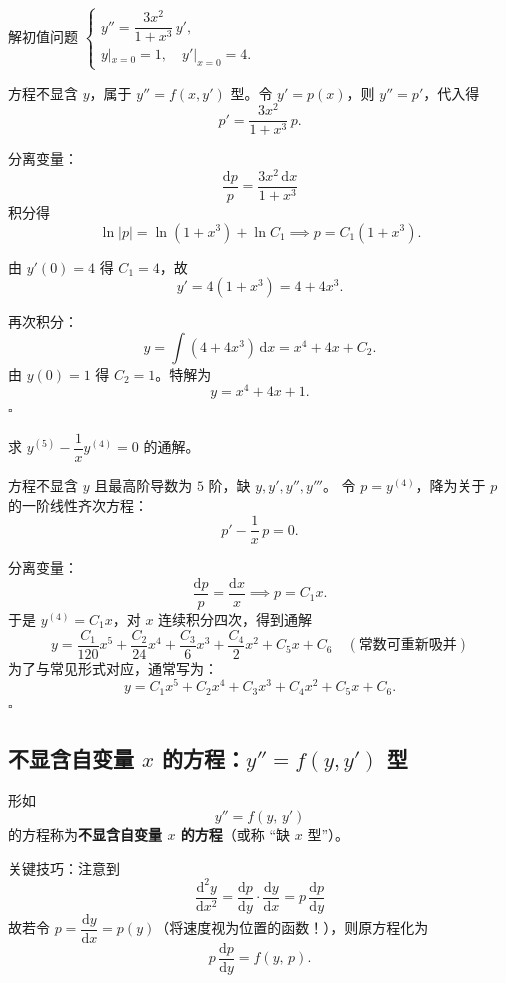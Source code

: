 \documentclass[lang=cn,11pt]{elegantbook}
\begin{document}
\begin{exercise}
解初值问题
$\begin{cases}
y''=\dfrac{3x^{2}}{1+x^{3}}\,y',\\
y|_{x=0}=1,\quad y'|_{x=0}=4.
\end{cases}$
\end{exercise}
\begin{solution}
方程不显含 $y$，属于 $y''=f(x,y')$ 型。令 $y'=p(x)$，则 $y''=p'$，代入得
\[
p'=\frac{3x^{2}}{1+x^{3}}\,p.
\]

分离变量：
\[
\frac{\mathrm{d}p}{p}=\frac{3x^{2}\,\mathrm{d}x}{1+x^{3}}
\]
积分得 
\[
\ln|p|=\ln(1+x^{3})+\ln C_1 \implies p=C_{1}(1+x^{3}).
\]

由 $y'(0)=4$ 得 $C_1=4$，故 
\[
y'=4(1+x^{3})=4+4x^{3}.
\]

再次积分：
\[
y=\int(4+4x^{3})\,\mathrm{d}x=x^{4}+4x+C_{2}.
\]
由 $y(0)=1$ 得 $C_2=1$。特解为
\[
\boxed{y=x^{4}+4x+1.}
\]
\hfill$\square$
\end{solution}

\begin{exercise}
求 $y^{(5)}-\dfrac{1}{x}y^{(4)}=0$ 的通解。
\end{exercise}
\begin{solution}
方程不显含 $y$ 且最高阶导数为 $5$ 阶，缺 $y,y',y'',y'''$。
令 $p=y^{(4)}$，降为关于 $p$ 的一阶线性齐次方程：
\[
p'-\frac{1}{x}\,p=0.
\]

分离变量：
\[
\frac{\mathrm{d}p}{p}=\frac{\mathrm{d}x}{x} \implies p=C_{1}x.
\]
于是 $y^{(4)}=C_{1}x$，对 $x$ 连续积分四次，得到通解
\[
\boxed{y=\frac{C_1}{120}x^{5}+\frac{C_2}{24}x^{4}+\frac{C_3}{6}x^{3}+\frac{C_4}{2}x^{2}+C_5x+C_6} \quad (\text{常数可重新吸并})
\]
为了与常见形式对应，通常写为：
\[
\boxed{y=C_1 x^{5}+C_2 x^{4}+C_3 x^{3}+C_4 x^{2}+C_5 x+C_{6}.}
\]
\hfill$\square$
\end{solution}


\subsection{不显含自变量 $x$ 的方程：$y''=f(y,y')$ 型}

\begin{definition} 
形如
\[y''=f(y,\,y')
\]
的方程称为\textbf{不显含自变量 $x$ 的方程}（或称 ``缺 $x$ 型''）。
\end{definition}

关键技巧：注意到 
\[
\dfrac{\mathrm{d}^2y}{\mathrm{d}x^{2}}
=\dfrac{\mathrm{d}p}{\mathrm{d}y}\cdot\dfrac{\mathrm{d}y}{\mathrm{d}x}=p\,\dfrac{\mathrm{d}p}{\mathrm{d}y}
\]
故若令 $p=\dfrac{\mathrm{d}y}{\mathrm{d}x}=p(y)$（将速度视为位置的函数！），则原方程化为
\[
p\,\frac{\mathrm{d}p}{\mathrm{d}y}=f(y,\,p).
\]
\end{document}
